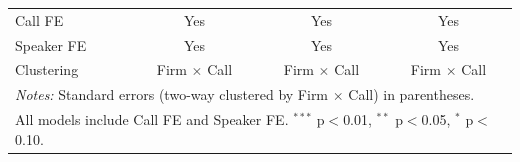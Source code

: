 \documentclass[11pt]{article}
\begin{document}
\begin{table}[htbp]
\begin{tabular}{lccc}
\midrule
Call FE & Yes & Yes & Yes \\
Speaker FE & Yes & Yes & Yes \\
Clustering & Firm $\times$ Call & Firm $\times$ Call & Firm $\times$ Call \\
\bottomrule
\multicolumn{4}{l}{\parbox{\linewidth}{\footnotesize \textit{Notes:} Standard errors (two-way clustered by Firm $\times$ Call) in parentheses.}} \\
\multicolumn{4}{l}{\parbox{\linewidth}{\footnotesize All models include Call FE and Speaker FE. $^{***}$ p$<$0.01, $^{**}$ p$<$0.05, $^{*}$ p$<$0.10.}} \\
\end{tabular}
\end{table}

\newpage

\end{document}
